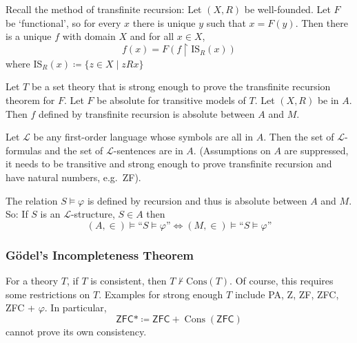 \documentclass{article}
\DeclareMathOperator{\cons}{Cons}
\let\models\vDash
\begin{document}
Recall the method of transfinite recursion:
Let $(X,R)$ be well-founded. Let $F$ be `functional', so for every $x$ there is unique $y$ such that $x = F(y)$.
Then there is a unique $f$ with domain $X$ and for all $x \in X$,
\begin{equation*}
  f(x) = F(f \upharpoonright \text{IS}_R(x))
\end{equation*}
where IS$_R(x) \coloneqq \{z \in X \mid zRx\}$

\begin{prop}
  Let $T$ be a set theory that is strong enough to prove the transfinite recursion theorem for $F$.
  Let $F$ be absolute for transitive models of $T$.
  Let $(X,R)$ be in $A$.
  Then $f$ defined by transfinite recursion is absolute between $A$ and $M$.
\end{prop}
\begin{eg}
  Let $\mathscr{L}$ be any first-order language whose symbols are all in $A$.
  Then the set of $\mathscr{L}$-formulas and the set of $\mathscr{L}$-sentences are in $A$.
  (Assumptions on $A$ are suppressed, it needs to be transitive and strong enough to prove transfinite recursion and have natural numbers, e.g.\ ZF).

  The relation $S \models \varphi$ is defined by recursion and thus is absolute between $A$ and $M$.
  So: If $S$ is an $\mathscr{L}$-structure, $S \in A$ then
  \begin{equation*}
    (A,\in) \models \text{``$S \models \varphi$''} \iff (M,\in) \models \text{``$S \models \varphi$''}
  \end{equation*}
\end{eg}

\subsubsection{G\"odel's Incompleteness Theorem}
For a theory $T$, if $T$ is consistent, then $T \nvdash \text{Cons}(T)$.
Of course, this requires some restrictions on $T$. Examples for strong enough $T$ include \textsf{PA}, \textsf{Z}, \textsf{ZF}, \textsf{ZFC}, \textsf{ZFC} + $\varphi$.
In particular,
\begin{equation*}
  \textsf{ZFC*} \coloneqq \textsf{ZFC} + \cons(\textsf{ZFC})
\end{equation*}
cannot prove its own consistency.
\end{document}
